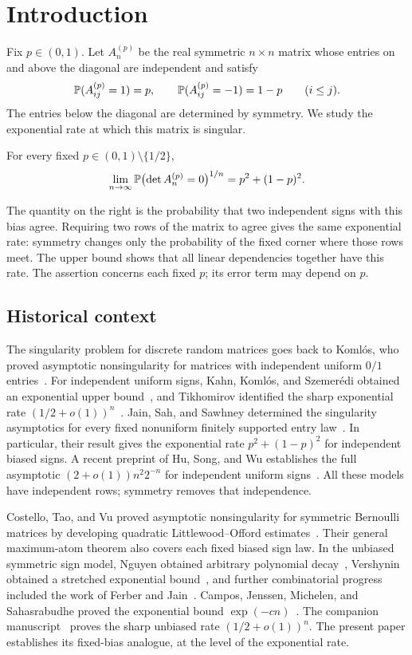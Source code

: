 \section{Introduction}\label{sec:introduction}

Fix $p\in(0,1)$. Let $A_n^{(p)}$ be the real symmetric $n\times n$
matrix whose entries on and above the diagonal are independent and satisfy
\[
 \mathbb P(A_{ij}^{(p)}=1)=p,\qquad
 \mathbb P(A_{ij}^{(p)}=-1)=1-p \qquad (i\le j).
\]
The entries below the diagonal are determined by symmetry. We study the
exponential rate at which this matrix is singular.

\begin{theorem}\label{thm:main}
For every fixed $p\in(0,1)\setminus\{1/2\}$,
\[
 \lim_{n\to\infty}\mathbb P\bigl(\det A_n^{(p)}=0\bigr)^{1/n}
   =p^2+(1-p)^2.
\]
\end{theorem}

The quantity on the right is the probability that two independent signs
with this bias agree. Requiring two rows of the matrix to agree gives the
same exponential rate: symmetry changes only the probability of the fixed
corner where those rows meet. The upper bound shows that all linear
dependencies together have this rate. The assertion concerns each fixed
$p$; its error term may depend on $p$.

\subsection{Historical context}

The singularity problem for discrete random matrices goes back to
Koml\'os, who proved asymptotic nonsingularity for matrices with
independent uniform \(0/1\) entries~\cite{Komlos}.
For independent uniform signs, Kahn, Koml\'os, and Szemer\'edi obtained
an exponential upper bound~\cite{KahnKomlosSzemeredi}, and Tikhomirov
identified the sharp exponential rate \((1/2+o(1))^n\)~\cite{Tikhomirov}.
Jain, Sah, and Sawhney determined the singularity asymptotics for every
fixed nonuniform finitely supported entry law~\cite{JainSahSawhneyDiscrete}.
In particular, their result gives the exponential rate
\(p^2+(1-p)^2\) for independent biased signs.
A recent preprint of Hu, Song, and Wu establishes the full asymptotic
\((2+o(1))n^2 2^{-n}\) for independent uniform signs~\cite{HuSongWu}.
All these models have independent rows; symmetry removes that independence.

Costello, Tao, and Vu proved asymptotic nonsingularity for symmetric
Bernoulli matrices by developing quadratic Littlewood--Offord
estimates~\cite{CTV}. Their general maximum-atom theorem also covers
each fixed biased sign law. In the unbiased symmetric sign model,
Nguyen obtained arbitrary polynomial decay~\cite{Nguyen}, Vershynin
obtained a stretched exponential bound~\cite{Vershynin}, and further
combinatorial progress included the work of Ferber and
Jain~\cite{FerberJain}. Campos, Jenssen, Michelen, and Sahasrabudhe
proved the exponential bound \(\exp(-cn)\)~\cite{SymmetricExponential}.
The companion manuscript~\cite{SymmetricRate} proves the sharp unbiased
rate \((1/2+o(1))^n\). The present paper establishes its fixed-bias
analogue, at the level of the exponential rate.

